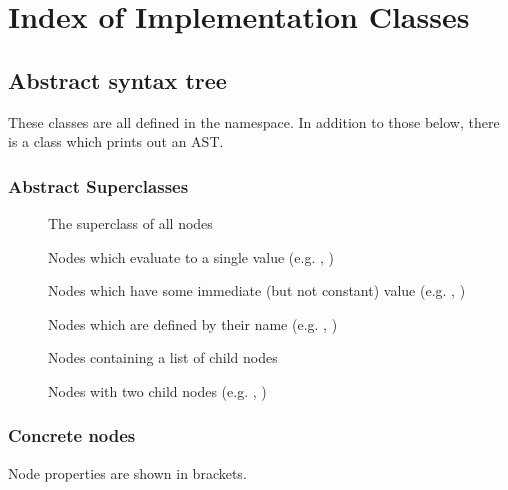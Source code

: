\section{Index of Implementation Classes}

\subsection{Abstract syntax tree}

These classes are all defined in the  namespace. In addition to those below, there is a  class which prints out an AST.

\subsubsection{Abstract Superclasses}

\begin{description}
	\item[] The superclass of all nodes
	
	\item[] Nodes which evaluate to a single value (e.g. , )
	
	\item[] Nodes which have some immediate (but not constant) value (e.g. , )
	
	\item[] Nodes which are defined by their name (e.g. , )
	
	\item[] Nodes containing a list of child nodes
	
	\item[] Nodes with two child nodes (e.g. , )
\end{description}

\subsubsection{Concrete nodes}

Node properties are shown in brackets.

